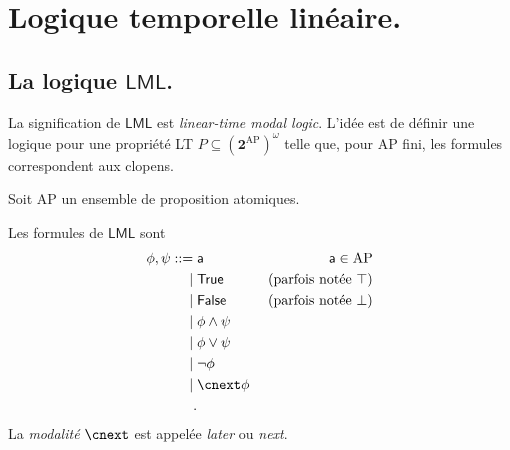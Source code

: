\documentclass[./main]{subfiles}
\begin{document}

  \chapter{Logique temporelle linéaire.}

  \section{La logique $\mathsf{LML}$.}

  \begin{rmk}[Idée]
    La signification de $\mathsf{LML}$ est \textit{linear-time modal logic}.
    L'idée est de définir une logique pour une propriété LT $P \subseteq (\mathbf{2}^\mathrm{AP})^\omega$ telle que, pour $\mathrm{AP}$ fini, les formules correspondent aux clopens.
  \end{rmk}

  Soit $\mathrm{AP}$ un ensemble de proposition atomiques.
  
  \begin{defn}
    Les formules de $\mathsf{LML}$ sont 
    \begin{align*}
      \phi, \psi ::={}&{} \mathsf{a} & \mathsf{a} \in \mathrm{AP}\\
      {}\mid{}&{} \mathsf{True} & \text{ (parfois notée $\top$)} \\
      {}\mid{}&{} \mathsf{False} & \text{ (parfois notée $\bot$)} \\
      {}\mid{}&{} \phi \land \psi \\
      {}\mid{}&{} \phi \lor \psi \\
      {}\mid{}&{} \lnot \phi \\
      {}\mid{}&{} \nxt \phi \\
    .\end{align*}
    La \textit{modalité} $\nxt$ est appelée \textit{later} ou \textit{next}.
  \end{defn}
\end{document}
